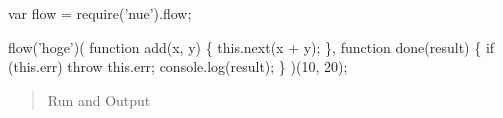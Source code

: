 \begin{DoxyCode}
var flow = require(\textcolor{stringliteral}{'nue'}).flow;

flow(\textcolor{stringliteral}{'hoge'})(
  \textcolor{keyword}{function} add(x, y) \{
    this.next(x + y);
  \},
  \textcolor{keyword}{function} done(result) \{
    \textcolor{keywordflow}{if} (this.err) \textcolor{keywordflow}{throw} this.err;
    console.log(result);
  \}
)(10, 20);
\end{DoxyCode}


\begin{quote}
Run and Output \end{quote}



 